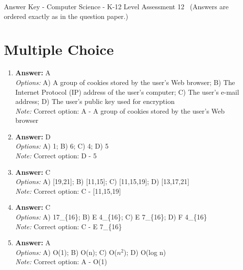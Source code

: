 \documentclass[12pt]{article}
\begin{document}
\begin{center}
Answer Key - Computer Science - K-12 Level Assessment 12 \
\small (Answers are ordered exactly as in the question paper.)
\end{center}

\section*{Multiple Choice}
\begin{enumerate}[label=\arabic*.]
\item \textbf{Answer:} A
\\ \textit{Options:} A) A group of cookies stored by the user's Web browser; B) The Internet Protocol (IP) address of the user's computer; C) The user's e-mail address; D) The user's public key used for encryption
\\ \textit{Note:} Correct option: A - A group of cookies stored by the user's Web browser
\item \textbf{Answer:} D
\\ \textit{Options:} A) 1; B) 6; C) 4; D) 5
\\ \textit{Note:} Correct option: D - 5
\item \textbf{Answer:} C
\\ \textit{Options:} A) [19,21]; B) [11,15]; C) [11,15,19]; D) [13,17,21]
\\ \textit{Note:} Correct option: C - [11,15,19]
\item \textbf{Answer:} C
\\ \textit{Options:} A) 17\_\{16\}; B) E 4\_\{16\}; C) E 7\_\{16\}; D) F 4\_\{16\}
\\ \textit{Note:} Correct option: C - E 7\_\{16\}
\item \textbf{Answer:} A
\\ \textit{Options:} A) O(1); B) O(n); C) O($n^2$); D) O(log n)
\\ \textit{Note:} Correct option: A - O(1)
\end{enumerate}
\end{document}
